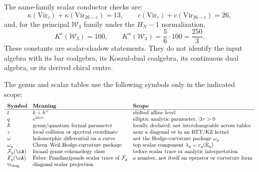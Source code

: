 \begin{convention}
\label{conv:scalar-conductor-checks}
\ClaimStatusDefinitional{}
The same-family scalar conductor checks are:
\[
\kappa(\mathrm{Vir}_c)+\kappa(\mathrm{Vir}_{26-c})=13,
\qquad
c(\mathrm{Vir}_c)+c(\mathrm{Vir}_{26-c})=26,
\]
and, for the principal $\mathcal W_3$ family under the
$H_N-1$ normalization,
\[
K^c(\mathcal W_3)=100,\qquad
K^\kappa(\mathcal W_3)=\frac{5}{6}\cdot 100=\frac{250}{3}.
\]
These constants are scalar-shadow statements.  They do not identify
the input algebra with its bar coalgebra, its Koszul-dual coalgebra,
its continuous dual algebra, or its derived chiral centre.
\end{convention}

\begin{convention}
\label{conv:genus-variable-normalization-table}
The genus and scalar tables use the following symbols only in the
indicated scope:
\[
\begin{array}{lll}
\textbf{Symbol} & \textbf{Meaning} & \textbf{Scope} \\
\hline
t & k+h^\vee & \text{shifted affine level} \\
q & e^{2\pi i\tau} & \text{elliptic analytic parameter, } \Im\tau>0 \\
\hbar & \text{genus/quantum formal parameter} &
 \text{locally declared; not interchangeable across tables} \\
z & \text{local collision or spectral coordinate} &
 \text{near a diagonal or in an RTT/KZ kernel} \\
\omega & \text{holomorphic differential on a curve} &
 \text{not the Hodge-curvature package } \omega_g \\
\omega_g & \text{Chern--Weil Hodge-curvature package} &
 \text{top scalar component } \lambda_g=c_g(\mathbb E_g) \\
\mathcal F_g(\cA) & \text{formal genus cohomology class} &
 \text{before scalar trace or analytic interpretation} \\
F_g(\cA) & \text{Faber--Pandharipande scalar trace of }\mathcal F_g &
 \text{a number, not itself an operator or curvature form} \\
\operatorname{tr}_{\mathrm{diag}} & \text{diagonal scalar projection} &

\end{array}\]
\end{convention}
